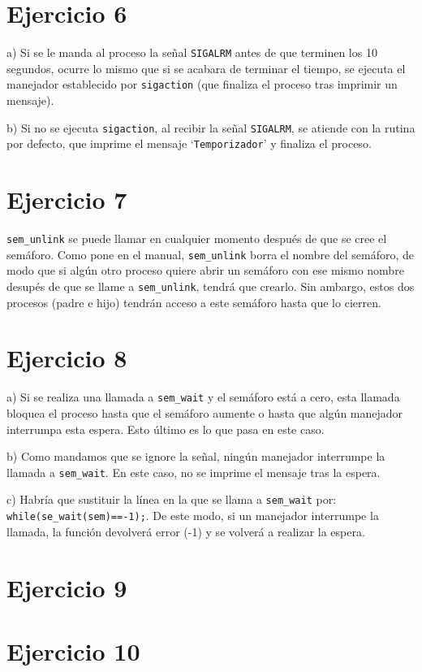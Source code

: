 \documentclass{article}
\begin{document}
\section*{Ejercicio 6}
a) Si se le manda al proceso la señal \texttt{SIGALRM} antes de que terminen los 10 segundos, ocurre lo mismo que si se acabara de terminar el tiempo, se ejecuta el manejador establecido por \texttt{sigaction} (que finaliza el proceso tras imprimir un mensaje).

b) Si no se ejecuta \texttt{sigaction}, al recibir la señal \texttt{SIGALRM}, se atiende con la rutina por defecto, que imprime el mensaje `\texttt{Temporizador}' y finaliza el proceso.

\section*{Ejercicio 7}
\texttt{sem\_unlink} se puede llamar en cualquier momento después de que se cree el semáforo. Como pone en el manual, \texttt{sem\_unlink} borra el nombre del semáforo, de modo que si algún otro proceso quiere abrir un semáforo con ese mismo nombre desupés de que se llame a \texttt{sem\_unlink}, tendrá que crearlo. Sin ambargo, estos dos procesos (padre e hijo) tendrán acceso a este semáforo hasta que lo cierren. 


\section*{Ejercicio 8}
a) Si se realiza una llamada a \texttt{sem\_wait} y el semáforo está a cero, esta llamada bloquea el proceso hasta que el semáforo aumente o hasta que algún manejador interrumpa esta espera. Esto último es lo que pasa en este caso. 

b) Como mandamos que se ignore la señal, ningún manejador interrumpe la llamada a \texttt{sem\_wait}. En este caso, no se imprime el mensaje tras la espera.

c) Habría que sustituir la línea en la que se llama a \texttt{sem\_wait} por: \texttt{while(se\_wait(sem)==-1);}. De este modo, si un manejador interrumpe la llamada, la función devolverá error (-1) y se volverá a realizar la espera.


\section*{Ejercicio 9}

\section*{Ejercicio 10}
\end{document}
